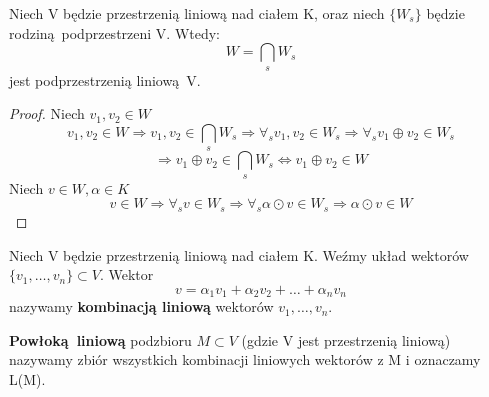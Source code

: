 \begin{theorem}
    \label{th:czesc_wspolna_podprzestrzeni}
    Niech V będzie przestrzenią liniową nad ciałem K, oraz niech $\{W_s\}$ będzie rodziną podprzestrzeni V. Wtedy:
    \begin{equation*}
        W = \bigcap_s W_s
    \end{equation*}
    jest podprzestrzenią liniową V.
        \begin{proof}
            Niech $v_1,v_2 \in W$
            \begin{equation*}
            v_1,v_2 \in W \Longrightarrow v_1,v_2 \in \bigcap_s W_s \Longrightarrow \forall_s v_1,v_2 \in W_s \Longrightarrow \forall_s v_1 \oplus v_2 \in W_s 
            \end{equation*}
            \begin{equation*}
                \Longrightarrow v_1\oplus v_2 \in \bigcap_s W_s \Leftrightarrow v_1\oplus v_2 \in W
            \end{equation*}
            Niech $v \in W, \alpha \in K$
            \begin{equation*}
                v \in W \Longrightarrow \forall_s v \in W_s \Longrightarrow \forall_s \alpha\odot v \in W_s \Longrightarrow \alpha\odot v \in W
            \end{equation*}
        \end{proof}
\end{theorem}
\begin{definition}
    Niech V będzie przestrzenią liniową nad ciałem K. Weźmy układ wektorów $\{v_1, \ldots, v_n\} \subset V$. Wektor
    \begin{equation*}
        v = \alpha_1 v_1 + \alpha_2 v_2 + \ldots + \alpha_n v_n
    \end{equation*}
    nazywamy \textbf{kombinacją liniową} wektorów $v_1,\ldots,v_n$.
\end{definition}
\begin{definition}
    \textbf{Powłoką liniową} podzbioru $M \subset V$ (gdzie V jest przestrzenią liniową) nazywamy zbiór wszystkich kombinacji liniowych wektorów z M i oznaczamy L(M).
\end{definition}
